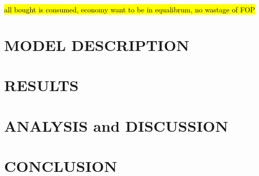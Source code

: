 \documentclass[10pt,twocolumn]{witseiepaper}
\begin{document}
\hl{all bought is consumed, economy want to be in equalibrum, no wastage of FOP}

\section{MODEL DESCRIPTION}

\section{RESULTS}

\section{ANALYSIS and DISCUSSION}

\section{CONCLUSION}


%



\end{document}
